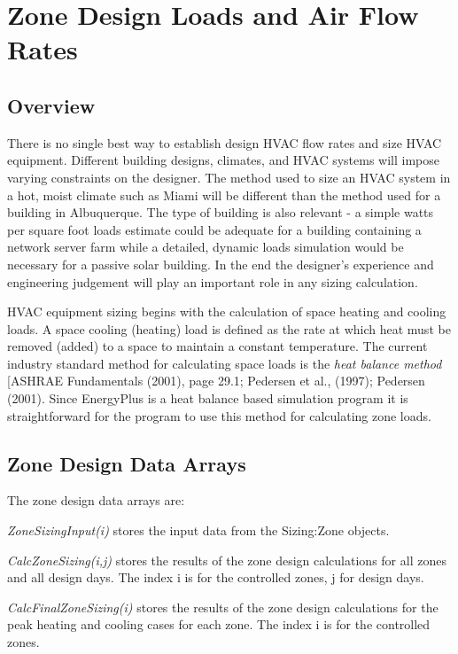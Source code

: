 \section{Zone Design Loads and Air Flow Rates}\label{zone-design-loads-and-air-flow-rates}

\subsection{Overview}\label{overview-030}

There is no single best way to establish design HVAC flow rates and size HVAC equipment. Different building designs, climates, and HVAC systems will impose varying constraints on the designer. The method used to size an HVAC system in a hot, moist climate such as Miami will be different than the method used for a building in Albuquerque. The type of building is also relevant - a simple watts per square foot loads estimate could be adequate for a building containing a network server farm while a detailed, dynamic loads simulation would be necessary for a passive solar building. In the end the designer's experience and engineering judgement will play an important role in any sizing calculation.

HVAC equipment sizing begins with the calculation of space heating and cooling loads. A space cooling (heating) load is defined as the rate at which heat must be removed (added) to a space to maintain a constant temperature. The current industry standard method for calculating space loads is the \emph{heat balance method} {[}ASHRAE Fundamentals (2001), page 29.1; Pedersen et al., (1997); Pedersen (2001). Since EnergyPlus is a heat balance based simulation program it is straightforward for the program to use this method for calculating zone loads.

\subsection{Zone Design Data Arrays}\label{zone-design-data-arrays}

The zone design data arrays are:

\emph{ZoneSizingInput(i)} stores the input data from the Sizing:Zone objects.

\emph{CalcZoneSizing(i,j)} stores the results of the zone design calculations for all zones and all design days. The index i is for the controlled zones, j for design days.

\emph{CalcFinalZoneSizing(i)} stores the results of the zone design calculations for the peak heating and cooling cases for each zone. The index i is for the controlled zones.

